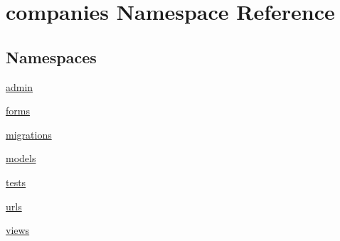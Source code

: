 \hypertarget{namespacecompanies}{\section{companies Namespace Reference}
\label{namespacecompanies}
}
\subsection*{Namespaces}
\begin{DoxyCompactItemize}
\item 
\hyperlink{namespacecompanies_1_1admin}{admin}
\item 
\hyperlink{namespacecompanies_1_1forms}{forms}
\item 
\hyperlink{namespacecompanies_1_1migrations}{migrations}
\item 
\hyperlink{namespacecompanies_1_1models}{models}
\item 
\hyperlink{namespacecompanies_1_1tests}{tests}
\item 
\hyperlink{namespacecompanies_1_1urls}{urls}
\item 
\hyperlink{namespacecompanies_1_1views}{views}
\end{DoxyCompactItemize}
